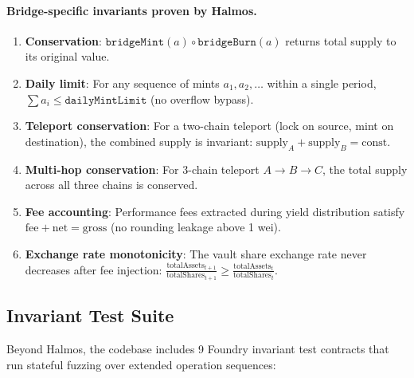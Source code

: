 \paragraph{Bridge-specific invariants proven by Halmos.}

\begin{enumerate}[leftmargin=1.1em]
  \item \textbf{Conservation}: $\texttt{bridgeMint}(a) \circ \texttt{bridgeBurn}(a)$ returns total supply to its original value.
  \item \textbf{Daily limit}: For any sequence of mints $a_1, a_2, \ldots$ within a single period, $\sum a_i \leq \texttt{dailyMintLimit}$ (no overflow bypass).
  \item \textbf{Teleport conservation}: For a two-chain teleport (lock on source, mint on destination), the combined supply is invariant: $\text{supply}_A + \text{supply}_B = \text{const}$.
  \item \textbf{Multi-hop conservation}: For 3-chain teleport $A \to B \to C$, the total supply across all three chains is conserved.
  \item \textbf{Fee accounting}: Performance fees extracted during yield distribution satisfy $\text{fee} + \text{net} = \text{gross}$ (no rounding leakage above 1 wei).
  \item \textbf{Exchange rate monotonicity}: The vault share exchange rate never decreases after fee injection: $\frac{\text{totalAssets}_{t+1}}{\text{totalShares}_{t+1}} \geq \frac{\text{totalAssets}_t}{\text{totalShares}_t}$.
\end{enumerate}

\subsection{Invariant Test Suite}

Beyond Halmos, the codebase includes 9 Foundry invariant test contracts that run stateful fuzzing over extended operation sequences:

